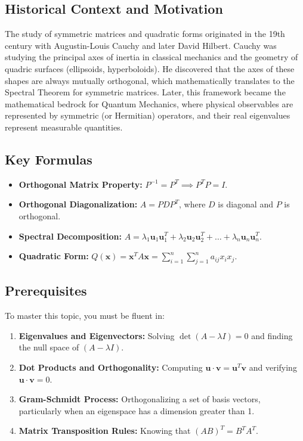 \documentclass[11pt, letterpaper]{article}
\theoremstyle{definition}
\theoremstyle{remark}
\begin{document}
\subsection{Historical Context and Motivation}
The study of symmetric matrices and quadratic forms originated in the 19th century with Augustin-Louis Cauchy and later David Hilbert. Cauchy was studying the principal axes of inertia in classical mechanics and the geometry of quadric surfaces (ellipsoids, hyperboloids). He discovered that the axes of these shapes are always mutually orthogonal, which mathematically translates to the Spectral Theorem for symmetric matrices. Later, this framework became the mathematical bedrock for Quantum Mechanics, where physical observables are represented by symmetric (or Hermitian) operators, and their real eigenvalues represent measurable quantities.

\subsection{Key Formulas}
\begin{itemize}
    \item \textbf{Orthogonal Matrix Property:} $P^{-1} = P^T \implies P^T P = I$.
    \item \textbf{Orthogonal Diagonalization:} $A = PDP^T$, where $D$ is diagonal and $P$ is orthogonal.
    \item \textbf{Spectral Decomposition:} $A = \lambda_1 \mathbf{u}_1 \mathbf{u}_1^T + \lambda_2 \mathbf{u}_2 \mathbf{u}_2^T + \dots + \lambda_n \mathbf{u}_n \mathbf{u}_n^T$.
    \item \textbf{Quadratic Form:} $Q(\mathbf{x}) = \mathbf{x}^T A \mathbf{x} = \sum_{i=1}^n \sum_{j=1}^n a_{ij} x_i x_j$.
\end{itemize}

\subsection{Prerequisites}
To master this topic, you must be fluent in:
\begin{enumerate}
    \item \textbf{Eigenvalues and Eigenvectors:} Solving $\det(A - \lambda I) = 0$ and finding the null space of $(A - \lambda I)$.
    \item \textbf{Dot Products and Orthogonality:} Computing $\mathbf{u} \cdot \mathbf{v} = \mathbf{u}^T \mathbf{v}$ and verifying $\mathbf{u} \cdot \mathbf{v} = 0$.
    \item \textbf{Gram-Schmidt Process:} Orthogonalizing a set of basis vectors, particularly when an eigenspace has a dimension greater than 1.
    \item \textbf{Matrix Transposition Rules:} Knowing that $(AB)^T = B^T A^T$.
\end{enumerate}
\end{document}
